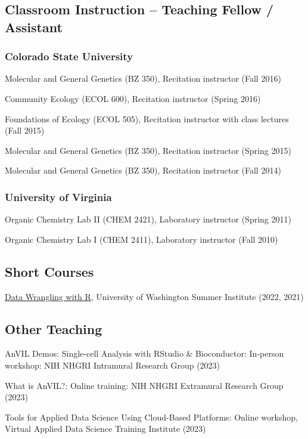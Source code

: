 \documentclass{cv}
\begin{document}
\subsection*{Classroom Instruction -- Teaching Fellow / Assistant}

\subsubsection*{Colorado State University}

Molecular and General Genetics (BZ 350), Recitation instructor (Fall 2016)

Community Ecology (ECOL 600), Recitation instructor (Spring 2016)

Foundations of Ecology (ECOL 505), Recitation instructor with class lectures (Fall 2015)

Molecular and General Genetics (BZ 350), Recitation instructor (Spring 2015)

Molecular and General Genetics (BZ 350), Recitation instructor (Fall 2014)

\subsubsection*{University of Virginia}

Organic Chemistry Lab II (CHEM 2421), Laboratory instructor (Spring 2011)

Organic Chemistry Lab I (CHEM 2411), Laboratory instructor (Fall 2010)

\subsection*{Short Courses}

\href{http://sisbid.github.io/Data-Wrangling/}{Data Wrangling with R}, University of Washington Summer Institute (2022, 2021)

\subsection*{Other Teaching}

AnVIL Demos: Single-cell Analysis with RStudio \& Bioconductor: In-person workshop: NIH NHGRI Intramural Research Group (2023)

What is AnVIL?: Online training: NIH NHGRI Extramural Research Group (2023)

Tools for Applied Data Science Using Cloud-Based Platforms: Online workshop, Virtual Applied Data Science Training Institute (2023)
\end{document}
